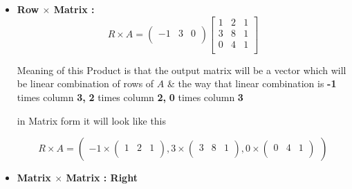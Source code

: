 \documentclass[a4paper,11pt]{article}
\numberwithin{equation}{section}
\begin{document}
\begin{itemize}
\begin{itemize}
                \item  \textbf{Row $ \times $ Matrix : }\\
                \begin{equation}
                    R \times A=
                    \begin{pmatrix}
                        -1 & 3 & 0 \\
                    \end{pmatrix}
                    \begin{bmatrix}
                        1 & 2 & 1 \\
                        3 & 8 & 1 \\
                        0 & 4 & 1 \\
                    \end{bmatrix}
                \end{equation}
                    
                Meaning of this Product is that the output matrix will be a vector which will be linear combination of rows of $A$ \& the way that linear combination is  \textbf{-1} times column \textbf{3,} \textbf{2} times column \textbf{2,} \textbf{0} times column \textbf{3} 

                in Matrix form it will look like this

                \begin{equation}
                    R \times A=
                    \begin{pmatrix}
                        -1 \times 
                        \begin{pmatrix}
                            1 & 2 & 1 \\
                        \end{pmatrix},
                        3 \times 
                        \begin{pmatrix}
                            3 & 8 & 1 \\
                        \end{pmatrix},
                        0 \times 
                        \begin{pmatrix}
                            0 & 4 & 1 \\
                        \end{pmatrix}
                    \end{pmatrix}
                \end{equation}
                \item \textbf{Matrix $ \times $ Matrix : Right }\\


\end{itemize}
\end{itemize}
\end{document}
